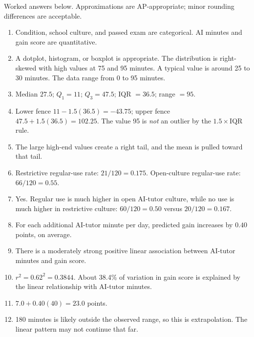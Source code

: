 \documentclass[11pt]{article}
\begin{document}
\begin{keybox}
Worked answers below. Approximations are AP-appropriate; minor
rounding differences are acceptable.
\end{keybox}

\begin{enumerate}[leftmargin=*]
\item Condition, school culture, and passed exam are categorical.
AI minutes and gain score are quantitative.

\item A dotplot, histogram, or boxplot is appropriate. The
distribution is right-skewed with high values at 75 and 95
minutes. A typical value is around 25 to 30 minutes. The data
range from 0 to 95 minutes.

\item Median $27.5$; $Q_1 = 11$; $Q_3 = 47.5$; IQR $= 36.5$; range $= 95$.

\item Lower fence $11 - 1.5(36.5) = -43.75$; upper fence
$47.5 + 1.5(36.5) = 102.25$. The value 95 is \emph{not} an outlier
by the $1.5 \times \text{IQR}$ rule.

\item The large high-end values create a right tail, and the mean is
pulled toward that tail.

\item Restrictive regular-use rate: $21/120 = 0.175$. Open-culture
regular-use rate: $66/120 = 0.55$.

\item Yes. Regular use is much higher in open AI-tutor culture, while
no use is much higher in restrictive culture: $60/120 = 0.50$
versus $20/120 = 0.167$.

\item For each additional AI-tutor minute per day, predicted gain
increases by $0.40$ points, on average.

\item There is a moderately strong positive linear association
between AI-tutor minutes and gain score.

\item $r^2 = 0.62^2 = 0.3844$. About 38.4\% of variation in gain
score is explained by the linear relationship with AI-tutor
minutes.

\item $7.0 + 0.40(40) = 23.0$ points.

\item 180 minutes is likely outside the observed range, so this is
extrapolation. The linear pattern may not continue that far.


\end{enumerate}
\end{document}
